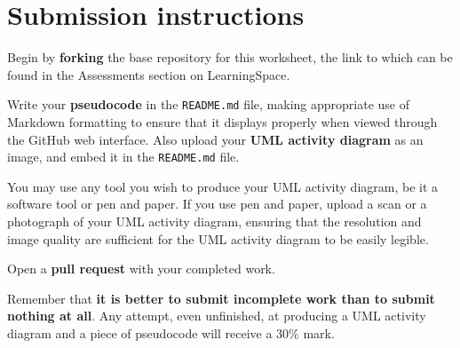 \documentclass{../../../fal_assignment}
\begin{document}
\section*{Submission instructions}

Begin by \textbf{forking} the base repository for this worksheet, the link to which can be found in the Assessments section on LearningSpace.

Write your \textbf{pseudocode} in the \texttt{README.md} file,
making appropriate use of Markdown formatting to ensure that it displays properly when viewed through the GitHub web interface.
Also upload your \textbf{UML activity diagram} as an image, and embed it in the \texttt{README.md} file.

You may use any tool you wish to produce your UML activity diagram,
be it a software tool or pen and paper.
If you use pen and paper, upload a scan or a photograph of your UML activity diagram,
ensuring that the resolution and image quality are sufficient for the UML activity diagram to be easily legible.

Open a \textbf{pull request} with your completed work.

Remember that \textbf{it is better to submit incomplete work than to submit nothing at all}.
Any attempt, even unfinished, at producing a UML activity diagram and a piece of pseudocode will receive a 30\% mark.
\end{document}
